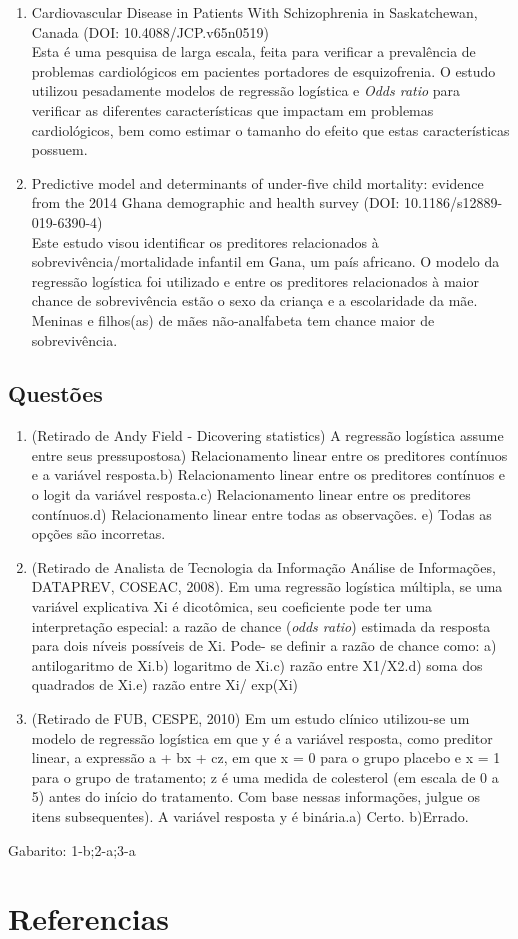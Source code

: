 \documentclass[
]{book}
\begin{document}
\begin{enumerate}
\def\labelenumi{\arabic{enumi}.}
\item
  Cardiovascular Disease in Patients With Schizophrenia in Saskatchewan, Canada (DOI: 10.4088/JCP.v65n0519)\\
  Esta é uma pesquisa de larga escala, feita para verificar a prevalência de problemas cardiológicos em pacientes portadores de esquizofrenia. O estudo utilizou pesadamente modelos de regressão logística e \emph{Odds ratio} para verificar as diferentes características que impactam em problemas cardiológicos, bem como estimar o tamanho do efeito que estas características possuem.
\item
  Predictive model and determinants of under-five child mortality: evidence from the 2014 Ghana demographic and health survey (DOI: 10.1186/s12889-019-6390-4)\\
  Este estudo visou identificar os preditores relacionados à sobrevivência/mortalidade infantil em Gana, um país africano. O modelo da regressão logística foi utilizado e entre os preditores relacionados à maior chance de sobrevivência estão o sexo da criança e a escolaridade da mãe. Meninas e filhos(as) de mães não-analfabeta tem chance maior de sobrevivência.
\end{enumerate}

\hypertarget{questuxf5es-10}{%
\section{Questões}\label{questuxf5es-10}}

\begin{enumerate}
\def\labelenumi{\arabic{enumi}.}
\item
  (Retirado de Andy Field - Dicovering statistics) A regressão logística assume entre seus pressupostosa) Relacionamento linear entre os preditores contínuos e a variável resposta.b) Relacionamento linear entre os preditores contínuos e o logit da variável resposta.c) Relacionamento linear entre os preditores contínuos.d) Relacionamento linear entre todas as observações. e) Todas as opções são incorretas.
\item
  (Retirado de Analista de Tecnologia da Informação Análise de Informações, DATAPREV, COSEAC, 2008). Em uma regressão logística múltipla, se uma variável explicativa Xi é dicotômica, seu coeficiente pode ter uma interpretação especial: a razão de chance (\emph{odds ratio}) estimada da resposta para dois níveis possíveis de Xi. Pode- se definir a razão de chance como: a) antilogaritmo de Xi.b) logaritmo de Xi.c) razão entre X1/X2.d) soma dos quadrados de Xi.e) razão entre Xi/ exp(Xi)
\item
  (Retirado de FUB, CESPE, 2010) Em um estudo clínico utilizou-se um modelo de regressão logística em que y é a variável resposta, como preditor linear, a expressão a + bx + cz, em que x = 0 para o grupo placebo e x = 1 para o grupo de tratamento; z é uma medida de colesterol (em escala de 0 a 5) antes do início do tratamento. Com base nessas informações, julgue os itens subsequentes). A variável resposta y é binária.a) Certo.
  b)Errado.
\end{enumerate}

Gabarito: 1-b;2-a;3-a

\hypertarget{referencias}{%
\chapter{Referencias}\label{referencias}}

  
\end{document}
